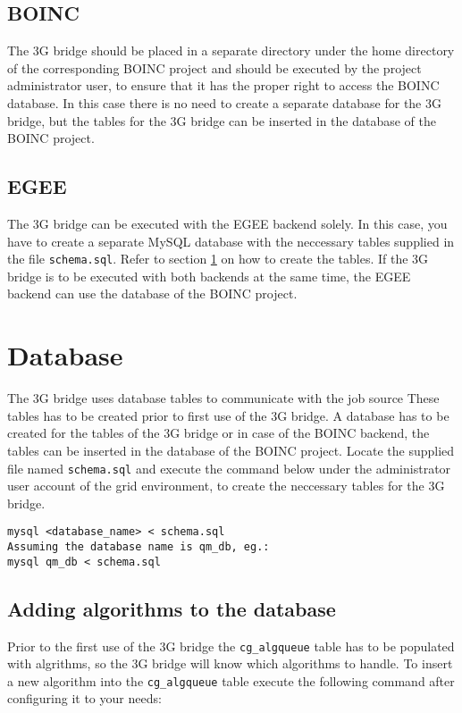 \documentclass[a4paper, 12pt]{article}
\begin{document}
\subsection{BOINC}
The 3G bridge should be placed in a separate directory under the home directory of the corresponding BOINC project and should be executed by the project administrator user, to ensure that it has the proper right to access the BOINC database. In this case there is no need to create a separate database for the 3G bridge, but the tables for the 3G bridge can be inserted in the database of the BOINC project.

\subsection{EGEE}
The 3G bridge can be executed with the EGEE backend solely. In this case, you have to create a separate MySQL database with the neccessary tables supplied in the file {\tt schema.sql}. Refer to section \ref{sec:db} on how to create the tables. If the 3G bridge is to be executed with both backends at the same time, the EGEE backend can use the database of the BOINC project. 

\section{Database}
\label{sec:db}

The 3G bridge uses database tables to communicate with the job source These tables has to be created prior to first use of the 3G bridge. A database has to be created for the tables of the 3G bridge or in case of the BOINC backend, the tables can be inserted in the database of the BOINC project. Locate the supplied file named {\tt schema.sql} and execute the command below under the administrator user account of the grid environment, to create the neccessary tables for the 3G bridge.
\begin{verbatim}
mysql <database_name> < schema.sql
Assuming the database name is qm_db, eg.:
mysql qm_db < schema.sql
\end{verbatim}

\subsection{Adding algorithms to the database}

Prior to the first use of the 3G bridge the {\tt cg\_algqueue} table has to be populated with algrithms, so the 3G bridge will know which algorithms to handle. To insert a new algorithm into the {\tt cg\_algqueue} table execute the following command after configuring it to your needs:
\end{document}
